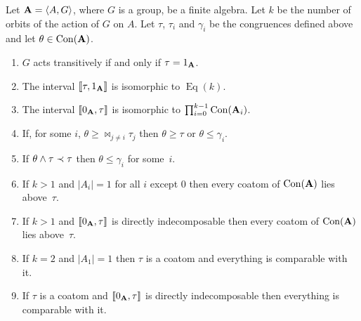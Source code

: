 \begin{theorem}\label{thm:intrans}
Let $\mathbf{A} = \langle A,G\rangle$, where $G$ is a group, be a finite algebra. 
Let $k$ be the number of orbits of the action of $G$ on $A$.
Let $\tau$, $\tau_i$ and $\gamma_i$
be the congruences defined above and let $\theta \in \operatorname{Con}(\mathbf{A})$.
\begin{enumerate}
\item\label{item1}
$G$ acts transitively if and only if $\tau = 1_{\mathbf{A}}$.
\item \label{item2}
The interval $\llbracket\tau,1_{\mathbf{A}}\rrbracket$ is isomorphic to $\operatorname{Eq}(k)$.
\item \label{item3}
The interval $\llbracket 0_{\mathbf{A}},\tau\rrbracket$ is isomorphic to $\prod_{i=0}^{k-1} \operatorname{Con}(\mathbf{A}_i)$.
\item\label{item4}
If, for some $i$, $\theta \ge \Join_{j \ne i} \tau_j$ then $\theta \ge \tau$
or $\theta \le \gamma_i$.
\item\label{item5}
If $\theta\wedge \tau \prec \tau$  then $\theta \le \gamma_i$ for some~$i$.
\item\label{item6}
If $k>1$ and $|A_i| = 1$ for all $i$ except $0$ then every coatom of $\operatorname{Con}(\mathbf{A})$
lies above~$\tau$.
\item\label{item7}
If $k>1$ and $\llbracket 0_{\mathbf{A}},\tau\rrbracket$ is directly indecomposable 
then every coatom of $\operatorname{Con}(\mathbf{A})$ lies above~$\tau$.
\item\label{item8}
If $k = 2$ and $|A_1| = 1$ then $\tau$ is a coatom and 
everything is comparable with it.
\item\label{item9}
If $\tau$ is a coatom and $\llbracket 0_{\mathbf{A}},\tau\rrbracket$ is directly indecomposable
then everything is comparable with it.
\end{enumerate}
\end{theorem}

